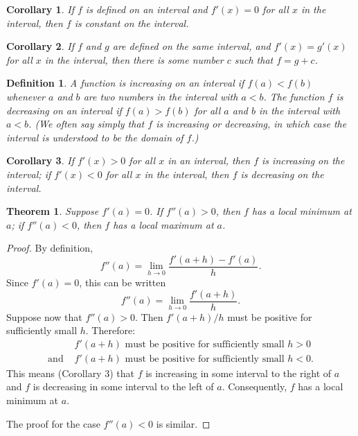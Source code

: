 \documentclass{article}
\newtheorem{corollary}{Corollary}
\newtheorem{definition}{Definition}
\newtheorem{theorem}{Theorem}
\begin{document}
\begin{corollary}
  If $f$ is defined on an interval and $f'(x) = 0$ for all $x$ in the interval,
  then $f$ is constant on the interval.
\end{corollary}

\begin{corollary}
  If $f$ and $g$ are defined on the same interval, and $f'(x) = g'(x)$ for all
  $x$ in the interval, then there is some number $c$ such that $f = g + c$.
\end{corollary}

\begin{definition}
  A function is \emph{increasing} on an interval if $f(a) < f(b)$ whenever $a$
  and $b$ are two numbers in the interval with $a < b$. The function $f$ is
  \emph{decreasing} on an interval if $f(a) > f(b)$ for all $a$ and $b$ in the
  interval with $a < b$. (We often say simply that $f$ is increasing or
  decreasing, in which case the interval is understood to be the domain of
  $f$.)
\end{definition}

\begin{corollary}
  If $f'(x) > 0$ for all $x$ in an interval, then $f$ is increasing on the
  interval; if $f'(x) < 0$ for all $x$ in the interval, then $f$ is decreasing
  on the interval.
\end{corollary}

\begin{theorem}
  Suppose $f'(a) = 0$. If $f''(a) > 0$, then $f$ has a local minimum at $a$; if
  $f''(a) < 0$, then $f$ has a local maximum at $a$.
\end{theorem}

\begin{proof}
  By definition, \[
    f''(a) = \lim_{h \to 0} \frac{f'(a + h) - f'(a)}{h}.
  \] Since $f'(a) = 0$, this can be written \[
    f''(a) = \lim_{h \to 0} \frac{f'(a + h)}{h}.
  \] Suppose now that $f''(a) > 0$. Then $f'(a + h) / h$ must be positive for
  sufficiently small $h$. Therefore: \begin{align*}
    &f'(a + h) \text{ must be positive for sufficiently small } h > 0 \\
    \text{and } &f'(a + h) \text{ must be positive for sufficiently small } h <
    0.
  \end{align*}
  This means (Corollary 3) that $f$ is increasing in some interval to the right
  of $a$ and $f$ is decreasing in some interval to the left of $a$.
  Consequently, $f$ has a local minimum at $a$.

  The proof for the case $f''(a) < 0$ is similar.
\end{proof}
\end{document}
